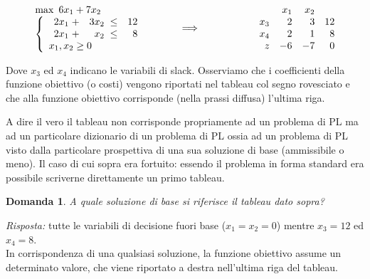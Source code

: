\documentclass[10pt]{article}
\newtheorem{Dom}{Domanda}%
\begin{document}
\[
   \begin{array}{l}
        \max \mbox{\ }6x_1 + 7x_2\\
        \left\{
        \begin{array}{l}
        \begin{array}{rrr}
            2x_1 \;+& 3x_2 \;\leq &   12 \\
            2x_1 \;+&  x_2 \;\leq &    8 \\
        \end{array} \\
        x_1, x_2  \geq 0    
        \end{array}
        \right.
   \end{array}
\hfill
\hspace{1cm}
{\Huge \Longrightarrow}
\hfill
\hspace{2cm}
   \begin{array}{rrrr}
         & x_1  & x_2  \\
      x_3 &  2 &  3 &  12 \\
      x_4 &  2 &  1 &   8 \\
       z  & -6 & -7 &   0 \\
   \end{array}
\]

Dove $x_3$ ed $x_4$ indicano le variabili di slack.
Osserviamo che i coefficienti della funzione obiettivo
(o costi) vengono riportati nel tableau col segno rovesciato
e che alla funzione obiettivo corrisponde 
(nella prassi diffusa)
l'ultima riga.

A dire il vero il tableau non corrisponde propriamente
ad un problema di PL ma ad un particolare dizionario
di un problema di PL ossia ad un problema di PL
visto dalla particolare prospettiva di una sua soluzione di base
(ammissibile o meno).
Il caso di cui sopra era fortuito:
essendo il problema in forma standard era possibile
scriverne direttamente un primo tableau.

\begin{Dom}
   A quale soluzione di base si riferisce
   il tableau dato sopra?
\end{Dom}
{\em Risposta: \/}
tutte le variabili di decisione fuori base
($x_1 = x_2 = 0$) mentre $x_3=12$ ed $x_4=8$.\\

In corrispondenza di una qualsiasi soluzione,
la funzione obiettivo assume un determinato valore,
che viene riportato a destra nell'ultima riga del tableau.\\
\end{document}
